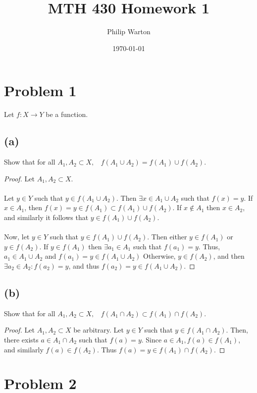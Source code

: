 \documentclass{article}
\begin{document}
\title{MTH 430 Homework 1}
\author{Philip Warton}
\date{\today}
\maketitle

\section*{Problem 1}
Let $f:X\rightarrow Y$ be a function.
\subsection*{(a)}
Show that for all $A_1, A_2 \subset X, \ \ \ \ f(A_1 \cup A_2) = f(A_1) \cup f(A_2)$.
\begin{proof}
    Let $A_1, A_2 \subset X$.
    \\\\
    \fbox{$\subset$}
    Let $y \in Y$ such that $y \in f(A_1 \cup A_2)$.
    Then $\exists x \in A_1 \cup A_2$ such that $f(x) = y$.
    If $x \in A_1$, then $f(x) = y \in f(A_1) \subset f(A_1) \cup f(A_2)$.
    If $x \notin A_1$ then $x \in A_2$, and similarly it follows that $y \in f(A_1) \cup f(A_2)$.
    \\\\
    \fbox{$\supset$}
    Now, let $y \in Y$ such that $y \in f(A_1) \cup f(A_2)$.
    Then either $y \in f(A_1)$ or $y \in f(A_2)$.
    If $y \in f(A_1)$ then $\exists a_1 \in A_1$ such that $f(a_1) = y$.
    Thus, $a_1 \in A_1 \cup A_2$ and $f(a_1) = y \in f(A_1 \cup A_2)$
    Otherwise, $y \in f(A_2)$, and then $\exists a_2 \in A_2 : f(a_2) = y$, and thus $f(a_2) = y \in f(A_1 \cup A_2)$.
\end{proof}
\subsection*{(b)}
Show that for all $A_1, A_2 \subset X, \ \ \ \ f(A_1 \cap A_2) \subset f(A_1) \cap f(A_2)$.
\begin{proof}
    Let $A_1, A_2 \subset X$ be arbitrary.
    Let $y \in Y$ such that $y \in f(A_1 \cap A_2)$.
    Then, there exists $a \in A_1 \cap A_2$ such that $f(a) = y$.
    Since $a \in A_1, f(a) \in f(A_1)$, and similarly $f(a) \in f(A_2)$.
    Thus $f(a) = y \in f(A_1) \cap f(A_2)$.
\end{proof}

\section*{Problem 2}
\end{document}
